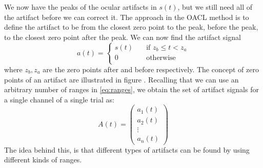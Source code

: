 We now have the peaks of the ocular artifacts in $s(t)$, but we still need all of the artifact before we can correct it. The approach in the OACL method is to define the artifact to be from the closest zero point to the peak, before the peak, to the closest zero point after the peak. We can now find the artifact signal 
\begin{equation}
\label{eq:artifactsignal}
a(t) =
\begin{cases}
s(t)      & \quad \text{if } z_b \leq t < z_a\\
0  & \quad \text{otherwise}\\
\end{cases}
\end{equation}
where $z_b, z_a$ are the zero points after and before respectively. The concept of zero points of an artifact are illustrated in figure .
Recalling that we can use an arbitrary number of ranges in \cref{eq:ranges}, we obtain the set of artifact signals for a single channel of a single trial as:
\begin{equation}
A(t)=  \begin{pmatrix}
a_1(t) \\
a_2(t) \\
\vdots  \\
a_n(t) 
\end{pmatrix}
\end{equation}
The idea behind this, is that different types of artifacts can be found by using different kinds of ranges. 
